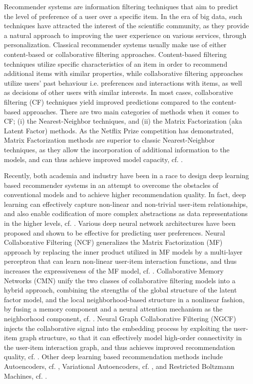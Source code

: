 Recommender systems are information filtering techniques that aim to predict the level of preference of a user over a specific item. 
In the era of big data, such techniques have attracted the interest of the scientific community, as they provide a natural approach to improving the user experience on various services, through personalization.
Classical recommender systems usually make use of either content-based or collaborative filtering approaches. 
Content-based filtering techniques utilize specific characteristics of an item in order to recommend additional items with similar properties, while collaborative filtering approaches utilize users' past behaviour i.e. preferences and interactions with items, as well as decisions of other users with similar interests. 
In most cases, collaborative filtering (CF) techniques yield improved predictions compared to the content-based approaches.
There are two main categories of methods when it comes to CF; (i) the Nearest-Neighbor techniques, and (ii) the Matrix Factorization (aka Latent Factor) methods.
As the Netflix Prize competition has demonstrated, Matrix Factorization methods are superior to classic Nearest-Neighbor techniques, as they allow the incorporation of additional information to the models, and can thus achieve improved model capacity, cf. \cite{koren2009matrix}.

Recently, both academia and industry have been in a race to design deep learning based recommender systems in an attempt to overcome the obstacles of conventional models and to achieve higher recommendation quality. 
In fact, deep learning can effectively capture non-linear and non-trivial user-item relationships, and also enable codification of more complex abstractions as data representations in the higher levels, cf. \cite{zhang2019deep}.
Various deep neural network architectures have been proposed and shown to be effective for predicting user preferences. 
Neural Collaborative Filtering (NCF) generalizes the Matrix Factorization (MF) approach by replacing the inner product utilized in MF models by a multi-layer perceptron that can learn non-linear user-item interaction functions, and thus increases the expressiveness of the MF model, cf. \cite{he2017neural}. 
Collaborative Memory Networks (CMN) unify the two classes of collaborative filtering models into a hybrid approach, combining the strengths of the global structure of the latent factor model, and the local neighborhood-based structure in a nonlinear fashion, by fusing a memory component and a neural attention mechanism as the neighborhood component, cf. \cite{ebesu2018collaborative}. 
Neural Graph Collaborative Filtering (NGCF) injects the collaborative signal into the embedding process by exploiting the user-item graph structure, so that it can effectively model high-order connectivity in the user-item interaction graph, and thus achieves improved recommendation quality, cf. \cite{wang2019neural}. 
Other deep learning based recommendation methods include Autoencoders, cf. \cite{sedhain2015autorec}, Variational Autoencoders, cf. \cite{liang2018variational}, and Restricted Boltzmann Machines, cf. \cite{salakhutdinov2007restricted}. 

